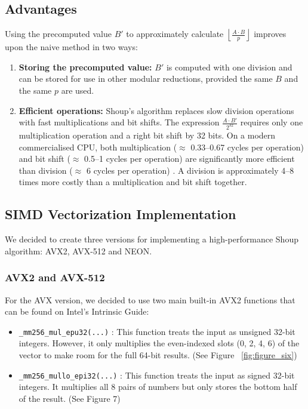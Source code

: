 \documentclass{article}
\begin{document}
\subsection{Advantages}
Using the precomputed value $B'$ to approximately calculate $\left\lfloor \frac{A \cdot B}{p} \right\rfloor$ improves upon the naive method in two ways:
\begin{enumerate}
    \item \textbf{Storing the precomputed value:}
          $B'$ is computed with one division and can be stored for use in other modular reductions, provided the same $B$ and the same $p$ are used.
    \item \textbf{Efficient operations:}
          Shoup's algorithm replaces slow division operations with fast multiplications and bit shifts. The expression $\frac{A \cdot B'}{2^{32}}$ requires only one multiplication operation and a right bit shift by 32 bits. On a modern commercialised CPU, both multiplication ($\approx$ 0.33--0.67 cycles per operation) and bit shift ($\approx$ 0.5--1 cycles per operation) are significantly more efficient than division ($\approx$ 6 cycles per operation) . A division is approximately 4--8 times more costly than a multiplication and bit shift together. \cite{uopsInfoTable}
\end{enumerate}


\subsection{SIMD Vectorization Implementation}
We decided to create three versions for implementing a high-performance Shoup algorithm: AVX2, AVX-512 and NEON.

\subsubsection{AVX2 and AVX-512}
For the AVX version, we decided to use two main built-in AVX2 functions that can be found on Intel's Intrinsic Guide: \cite{intel_instrinsics}
\begin{itemize}
    \item \texttt{\_mm256\_mul\_epu32(...)} : This function treats the input as unsigned 32-bit integers. However, it only multiplies the even-indexed slots (0, 2, 4, 6) of the vector to make room for the full 64-bit results. (See Figure ~\ref{fig:figure_six})
    \item \texttt{\_mm256\_mullo\_epi32(...)} : This function treats the input as signed 32-bit integers. It multiplies all 8 pairs of numbers but only stores the bottom half of the result. (See Figure 7)
\end{itemize}
\end{document}
